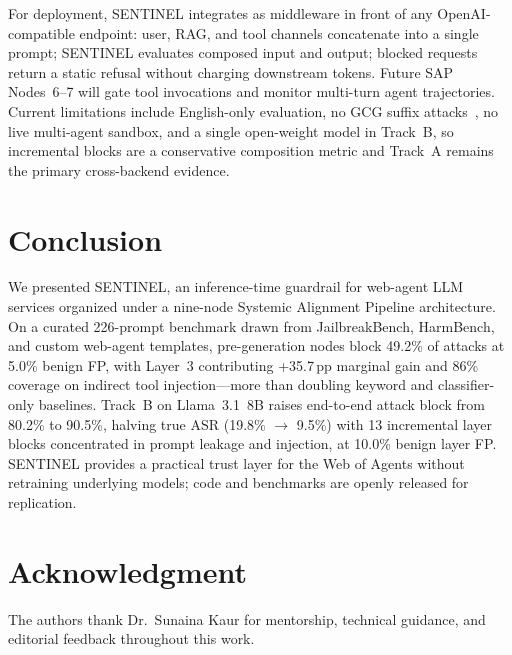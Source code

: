 \documentclass[conference]{IEEEtran}
\newcommand{\sap}{Systemic Alignment Pipeline}
\begin{document}
For deployment, SENTINEL integrates as middleware in front of any
OpenAI-compatible endpoint: user, RAG, and tool channels concatenate into a
single prompt; SENTINEL evaluates composed input and output; blocked requests
return a static refusal without charging downstream tokens.
Future SAP Nodes~6--7 will gate tool invocations and monitor multi-turn agent
trajectories.
Current limitations include English-only evaluation, no GCG suffix
attacks~\cite{zou2023universal}, no live multi-agent sandbox, and a single
open-weight model in Track~B, so incremental blocks are a conservative
composition metric and Track~A remains the primary cross-backend evidence.

\section{Conclusion}
\label{sec:conclusion}

We presented SENTINEL, an inference-time guardrail for web-agent LLM services
organized under a nine-node \sap{} architecture.
On a curated 226-prompt benchmark drawn from JailbreakBench, HarmBench, and
custom web-agent templates, pre-generation nodes block 49.2\% of attacks at
5.0\% benign FP, with Layer~3 contributing +35.7\,pp marginal gain and 86\%
coverage on indirect tool injection---more than doubling keyword and
classifier-only baselines.
Track~B on Llama~3.1~8B raises end-to-end attack block from 80.2\% to 90.5\%,
halving true ASR (19.8\% $\rightarrow$ 9.5\%) with 13 incremental layer blocks
concentrated in prompt leakage and injection, at 10.0\% benign layer FP.
SENTINEL provides a practical trust layer for the Web of Agents without
retraining underlying models; code and benchmarks are openly released for
replication.

\section*{Acknowledgment}
The authors thank Dr.\ Sunaina Kaur for mentorship, technical guidance, and
editorial feedback throughout this work.
\end{document}
